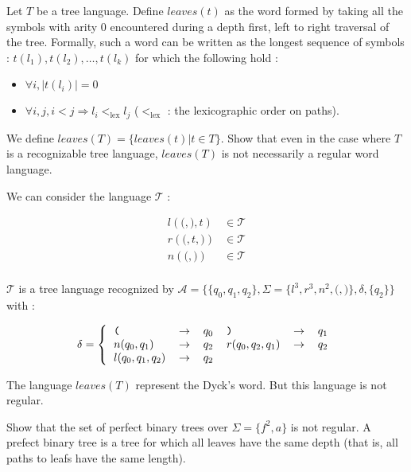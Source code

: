 \documentclass{article}
\theoremstyle{plain}
\begin{document}
  \exercice Let $T$ be a tree language. Define $\textit{leaves}(t)$ as the word
  formed by taking all the symbols with arity 0 encountered during a depth
  first, left to right traversal of the tree. Formally, such a word can be
  written as the longest sequence of symbols : $t(l_1), t(l_2), \ldots, t(l_k)$
  for which the following hold :
  \begin{itemize}
    \item $\forall i, |t(l_i)| = 0$
    \item $\forall i, j, i < j \Rightarrow l_i <_{\text{lex}} l_j$
      ($<_{\text{lex}}$ : the lexicographic order on paths).
  \end{itemize}
  We define $\textit{leaves}(T) = \{\textit{leaves}(t) | t \in T\}$. Show that
  even in the case where $T$ is a recognizable tree language,
  $\textit{leaves}(T)$ is not necessarily a regular word language.
 
  \begin{correction}{}{}
    We can consider the language $\mathcal T$ :

    \begin{align*}
      l(\texttt (, \texttt ), t) &\in \mathcal T \\
      r(\texttt (, t, \texttt )) &\in \mathcal T \\
      n(\texttt (, \texttt )) &\in \mathcal T \\
    \end{align*}

    $\mathcal T$ is a tree language recognized by
    $\mathcal A =\{\{q_0, q_1, q_2\}, \Sigma = \{l^3, r^3, n^2, \texttt (,
    \texttt)\}, \delta, \{q_2\}\}$ with :

    \[
      \delta = \left \{
        \begin{tabular}{l l l l l l}
          $\texttt ($   & $\to$ & $q_0$ & $\texttt )$        & $\to$ & $q_1$ \\
          $n(q_0, q_1)$ & $\to$ & $q_2$ & $r(q_0, q_2, q_1)$ & $\to$ & $q_2$ \\
          $l(q_0, q_1, q_2)$ & $\to$ & $q_2$ \\
        \end{tabular}
        \right.
    \]

    The language $\textit{leaves}(T)$ represent the Dyck's word. But this
    language is not regular.
  \end{correction}

  \newpage
  \exercice Show that the set of perfect binary trees over $\Sigma = \{f^2, a\}$
  is not regular. A prefect binary tree is a tree for which all leaves have the
  same depth (that is, all paths to leafs have the same length).
\end{document}
